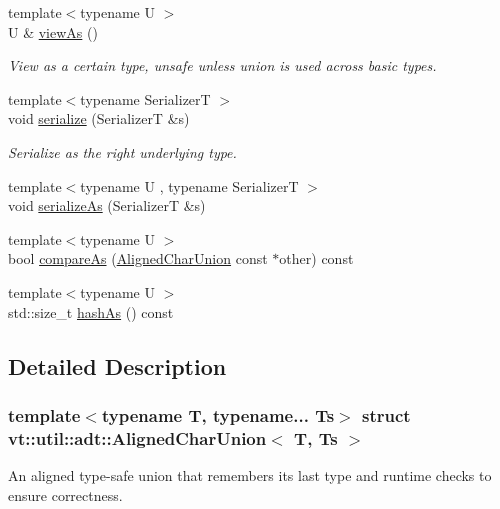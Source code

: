 \begin{DoxyCompactItemize}
{\footnotesize template$<$typename U $>$ }\\U \& \hyperlink{structvt_1_1util_1_1adt_1_1_aligned_char_union_af9bd3e00a355dca08d88103852f716ce}{view\+As} ()
\begin{DoxyCompactList}\small\item\em View as a certain type, unsafe unless union is used across basic types. \end{DoxyCompactList}\item 
{\footnotesize template$<$typename SerializerT $>$ }\\void \hyperlink{structvt_1_1util_1_1adt_1_1_aligned_char_union_a3b7862db1eb10fc16c66aa09a4e3fec6}{serialize} (SerializerT \&s)
\begin{DoxyCompactList}\small\item\em Serialize as the right underlying type. \end{DoxyCompactList}\item 
{\footnotesize template$<$typename U , typename SerializerT $>$ }\\void \hyperlink{structvt_1_1util_1_1adt_1_1_aligned_char_union_a1278b482c837c11fd2f6f41b7f8b0f33}{serialize\+As} (SerializerT \&s)
\item 
{\footnotesize template$<$typename U $>$ }\\bool \hyperlink{structvt_1_1util_1_1adt_1_1_aligned_char_union_ac2ba0a705e45724c9882b904b5c1231b}{compare\+As} (\hyperlink{structvt_1_1util_1_1adt_1_1_aligned_char_union}{Aligned\+Char\+Union} const $\ast$other) const
\item 
{\footnotesize template$<$typename U $>$ }\\std\+::size\+\_\+t \hyperlink{structvt_1_1util_1_1adt_1_1_aligned_char_union_a7c7bfb6979d827a602e4aba1f6886cb8}{hash\+As} () const
\end{DoxyCompactItemize}


\subsection{Detailed Description}
\subsubsection*{template$<$typename T, typename... Ts$>$\newline
struct vt\+::util\+::adt\+::\+Aligned\+Char\+Union$<$ T, Ts $>$}

An aligned type-\/safe union that remembers its last type and runtime checks to ensure correctness. 

